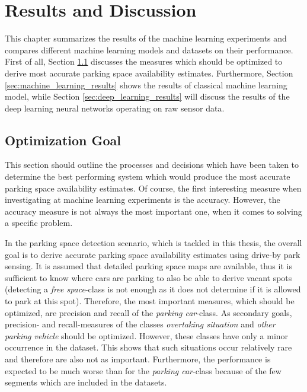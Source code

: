 \chapter{Results and Discussion}
\label{chap:evaluation}

This chapter summarizes the results of the machine learning experiments and compares different machine learning models and datasets on their performance. First of all, Section \ref{sec:optimization_goal} discusses the measures which should be optimized to derive most accurate parking space availability estimates. Furthermore, Section \ref{sec:machine_learning_results} shows the results of classical machine learning model, while Section \ref{sec:deep_learning_results} will discuss the results of the deep learning neural networks operating on raw sensor data.






\section{Optimization Goal}
\label{sec:optimization_goal}

This section should outline the processes and decisions which have been taken to determine the best performing system which would produce the most accurate parking space availability estimates. Of course, the first interesting measure when investigating at machine learning experiments is the accuracy. However, the accuracy measure is not always the most important one, when it comes to solving a specific problem. 

In the parking space detection scenario, which is tackled in this thesis, the overall goal is to derive accurate parking space availability estimates using drive-by park sensing. It is assumed that detailed parking space maps are available, thus it is sufficient to know where cars are parking to also be able to derive vacant spots (detecting a \emph{free space}-class is not enough as it does not determine if it is allowed to park at this spot). Therefore, the most important measures, which should be optimized, are precision and recall of the \emph{parking car}-class. As secondary goals, precision- and recall-measures of the classes \emph{overtaking situation} and \emph{other parking vehicle} should be optimized. However, these classes have only a minor occurrence in the dataset. This shows that such situations occur relatively rare and therefore are also not as important. Furthermore, the performance is expected to be much worse than for the \emph{parking car}-class because of the few segments which are included in the datasets.


